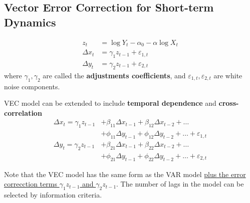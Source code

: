 \documentclass[11pt]{article}
\begin{document}
        \subsection{Vector Error Correction for Short-term Dynamics}
            \begin{definition}
                \begin{align}
                    z_t &= \log Y_t - \alpha_0 - \alpha \log X_t \\
                    \Delta x_t &= \gamma_1 z_{t-1} + \varepsilon_{1,t} \\
                    \Delta y_t &= \gamma_2 z_{t-1} + \varepsilon_{2,t}
                \end{align}
                where $\gamma_1, \gamma_2$ are called the \textbf{adjustments coefficients}, and $\varepsilon_{1, t}, \varepsilon_{2, t}$ are white noise components.
            \end{definition}

            \begin{definition}
                VEC model can be extended to include \textbf{temporal dependence} and \textbf{cross-correlation}
                \begin{align}
                    \Delta x_t = \gamma_1 z_{t-1} &+ \beta_{11} \Delta x_{t-1} + \beta_{12} \Delta x_{t-2} + \dots \\
                    &+ \phi_{11} \Delta y_{t-1} + \phi_{12} \Delta y_{t-2} + \dots + \varepsilon_{1, t} \\
                    \Delta y_t = \gamma_2 z_{t-1} &+ \beta_{21} \Delta x_{t-1} + \beta_{22} \Delta x_{t-2} + \dots \\
                    &+ \phi_{21} \Delta y_{t-1} + \phi_{22} \Delta y_{t-2} + \dots + \varepsilon_{2, t}
                \end{align}
            \end{definition}
            
            \begin{remark}
                Note that the VEC model has the same form as the VAR model \ul{plus the error correcction terms $\gamma_1 z_{t-1}$ and $\gamma_2 z_{t-1}$}. The number of lags in the model can be selected by information criteria.
            \end{remark}
            
\end{document}
